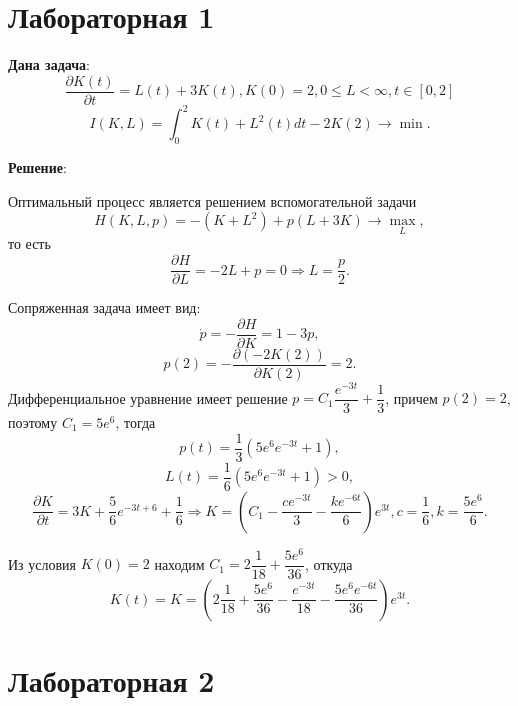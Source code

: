 \documentclass[a4paper, 12pt]{article}
\newcommand{\df}[2]{\frac{\partial #1}{\partial #2}}
\begin{document}
\section{Лабораторная 1}
{\bf Дана задача}:
\begin{equation}
    \dfrac{\partial K(t)}{\partial t}=L(t)+3K(t), K(0)=2,0\le L < \infty, t \in [0,2]
\end{equation}    
\begin{equation}
    I(K,L)=\int_0^2 K(t)+L^2(t) dt - 2 K(2) \rightarrow \min.
\end{equation}

{\bf Решение}:

Оптимальный процесс является решением вспомогательной задачи
\begin{equation}
    H(K,L,p)=-(K+L^2)+p(L+3K)\rightarrow \max_L,
\end{equation}
то есть 
\begin{equation}
   \df{H}{L}=-2L+p=0 \Rightarrow L=\frac{p}{2}.
\end{equation}

Сопряженная задача имеет вид:
\begin{equation}
    \dot p = -\df{H}{K}=1-3p,
\end{equation}
\begin{equation}
    p(2)=-\df{(-2K(2))}{K(2)}=2.
\end{equation}
Дифференциальное уравнение имеет решение $p=C_1 \dfrac{e^{-3t}}{3} +\dfrac{1}{3}$, причем $p(2)=2$, поэтому $C_1=5 e^{6}$, тогда
\begin{equation}
    p(t)=\dfrac{1}{3}\left(5e^{6} e^{-3t}+1 \right) ,
\end{equation}
\begin{equation}
    L(t)=\dfrac{1}{6}\left(5e^{6} e^{-3t}+1 \right)>0,
\end{equation}
\begin{equation}
    \df{K}{t}=3K+\dfrac{5}{6} e^{-3t+6}+\dfrac{1}{6} \Rightarrow K=\left(C_1- \dfrac{c e^{-3t}}{3}- \dfrac{k e^{-6t}}{6}\right) e^{3t},c=\dfrac{1}{6},k=\dfrac{5 e^{6}}{6}.
\end{equation}

Из условия $K(0)=2$ находим $C_1=2\dfrac{1}{18}+\dfrac{5 e^{6}}{36}$, откуда 
\begin{equation}
    K(t)=K=\left(2\dfrac{1}{18}+\dfrac{5 e^{6}}{36}- \dfrac{e^{-3t}}{18}-\dfrac{5 e^{6} e^{-6t}}{36}\right) e^{3t}.
\end{equation}


\section{Лабораторная 2}
\end{document}
